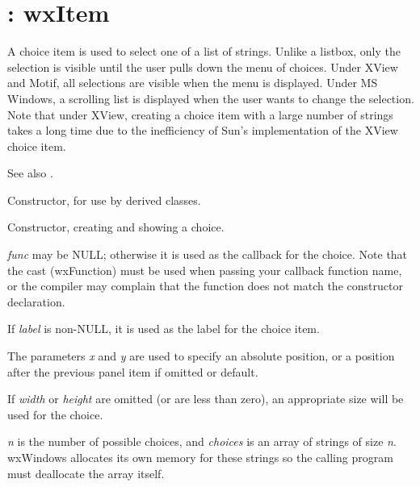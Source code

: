 \section{: wxItem}\label{wxchoice}

A choice item is used to select one of a list of strings. Unlike a
listbox, only the selection is visible until the user pulls down the
menu of choices. Under XView and Motif, all selections are visible
when the menu is displayed. Under MS Windows, a scrolling list is
displayed when the user wants to change the selection. Note that under
XView, creating a choice item with a large number of strings takes a
long time due to the inefficiency of Sun's implementation of the XView
choice item.

See also .

\label{constrchoice}


Constructor, for use by derived classes.


Constructor, creating and showing a choice. 

{\it func} may be NULL; otherwise it is used as the callback for the
choice.  Note that the cast (wxFunction) must be used when passing your
callback function name, or the compiler may complain that the function
does not match the constructor declaration.

If {\it label} is non-NULL, it is used as the label for the choice item.

The parameters {\it x} and {\it y} are used to specify an absolute
position, or a position after the previous panel item if omitted or
default.

If {\it width} or {\it height} are omitted (or are less than zero), an
appropriate size will be used for the choice.

{\it n} is the number of possible choices, and {\it choices} is an
array of strings of size {\it n}. wxWindows allocates its own memory
for these strings so the calling program must deallocate the array
itself.

